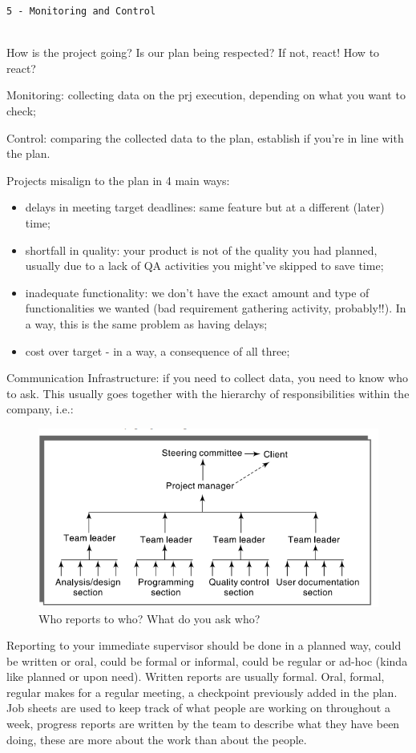 
\begin{center}\texttt{5 - Monitoring and Control}\end{center}
\hrulefill \\

\noindent How is the project going? Is our plan being respected? If not, react! How to react? 

\noindent Monitoring: collecting data on the prj execution, depending on what you want to check;

\noindent Control: comparing the collected data to the plan, establish if you're in line with the plan.

\noindent Projects misalign to the plan in 4 main ways:
\begin{itemize}
    \item delays in meeting target deadlines: same feature but at a different (later) time;
    \item shortfall in quality: your product is not of the quality you had planned, usually due to a lack of QA activities you might've skipped to save time;
    \item inadequate functionality: we don't have the exact amount and type of functionalities we wanted (bad requirement gathering activity, probably!!). In a way, this is the same problem as having delays;
    \item cost over target - in a way, a consequence of all three;
\end{itemize}

\noindent Communication Infrastructure: if you need to collect data, you need to know who to ask. This usually goes together with the hierarchy of responsibilities within the company, i.e.: 

\begin{figure} [H]
    \centering
    \includegraphics[width=0.75\linewidth]{Figures//06/randc.png}
    \caption{Who reports to who? What do you ask who?}
\end{figure}

\noindent Reporting to your immediate supervisor should be done in a planned way, could be written or oral, could be formal or informal, could be regular or ad-hoc (kinda like planned or upon need). Written reports are usually formal. Oral, formal, regular makes for a regular meeting, a checkpoint previously added in the plan. Job sheets are used to keep track of what people are working on throughout a week, progress reports are written by the team to describe what they have been doing, these are more about the work than about the people.

